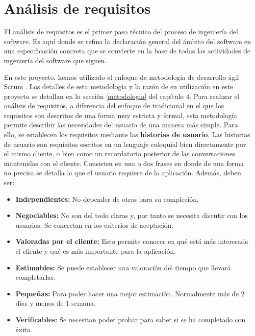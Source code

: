 
\chapter{Análisis de requisitos}
El análisis de requisitos es el primer paso técnico del proceso de ingeniería del software. Es aquí donde se refina la declaración general del ámbito del software en una especificación concreta que se convierte en la base de todas las actividades de ingeniería del software que siguen.

En este proyecto, hemos utilizado el enfoque de metodología de desarrollo ágil Scrum \cite{libroscrum}. Los detalles de esta metodología y la razón de su utilización en este proyecto se detallan en la sección \ref{metodologia} del capítulo 4. Para realizar el análisis de requisitos, a diferencia del enfoque de tradicional en el que los requisitos son descritos de una forma muy estricta y formal, esta metodología permite describir las necesidades del usuario de una manera más simple. Para ello, se establecen los requisitos mediante las \textbf{historias de usuario}. Las historias de usuario son requisitos escritos en un lenguaje coloquial bien directamente por el mismo cliente, o bien como un recordatorio posterior de las conversaciones mantenidas con el cliente. Consisten en una o dos frases en donde de una forma no precisa se detalla lo que el usuario requiere de la aplicación. Además, deben ser:

\begin{itemize}
\item \textbf{Independientes:} No depender de otras para su compleción.
\item \textbf{Negociables:} No son del todo claras y, por tanto se necesita discutir con los usuarios. Se concretan en los criterios de aceptación.
\item \textbf{Valoradas por el cliente:} Esto permite conocer en qué está más interesado el cliente y qué es más importante para la aplicación.
\item \textbf{Estimables:} Se puede establecer una valoración del tiempo que llevará completarlas.
\item \textbf{Pequeñas:} Para poder hacer una mejor estimación. Normalmente más de 2 días y menos de 1 semana.
\item \textbf{Verificables:} Se necesitan poder probar para saber si se ha completado con éxito. 
\end{itemize}

